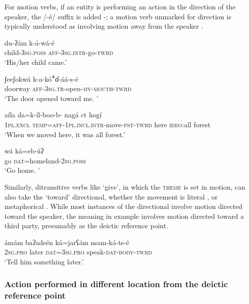 \documentclass[output=paper]{langsci/langscibook}
\begin{document}
For motion verbs, if an entity is performing an action in the direction of the speaker, the /-é/ suffix is added -; a motion verb unmarked for direction is typically understood as involving motion away from the speaker . 

\ea\label{ex:ahlandc:29}
\gll
du-ʔám  k-á-wá-é \\
child{}-\textsc{3sg.poss}  \textsc{aff-3sg.intr}{}-go-\textsc{twrd} \\
\glt
‘His/her child came.’
\z

\ea\label{ex:ahlandc:30}
\gll
ʃeeʃokwá  k-a-k\'{o}\textsf{ꜜ}ɗ{}-áá-s-é \\
doorway  \textsc{aff-3sg.tr}{}-open-\textsc{mv-mouth-twrd} \\ 
\glt
‘The door opened toward me. ’
\z

\ea\label{ex:ahlandc:31}
\gll
aíla  da=k-íl-boo-b-  nagá ct  hogí \\
\textsc{1pl.excl}  \textsc{temp=aff-1pl.incl.intr}{}-move-\textsc{pst-twrd}  here  \textsc{ideo}:all  forest \\
\glt
‘When we moved here, it was all forest.’
\z

\ea\label{ex:ahlandc:32}
\gll
wá ká=eb-\'{u}ʔ  \\
go  \textsc{dat}=homeland-\textsc{2sg.poss} \\
\glt
‘Go home. ’  
\z

Similarly, ditransitive verbs like ‘give’, in which the \textsc{theme} is set in motion, can also take the ‘toward’ directional, whether the movement is literal ,  or metaphorical . While most instances of the directional involve motion directed toward the speaker, the meaning in example  involves motion directed toward a third party, presumably as the deictic reference point.

\ea\label{ex:ahlandc:33}
\gll
ámám  baʔadeén  ká=jarʕám  nsam-ká-ts-é  \\
\textsc{2sg.pro}  later  \textsc{dat=3sg.pro}  speak-\textsc{dat-body-twrd} \\
\glt
‘Tell him something later.’
\z


\subsubsection{Action performed in different location from the deictic reference point}\label{sec:ahlandc:4.6.2}
\end{document}
